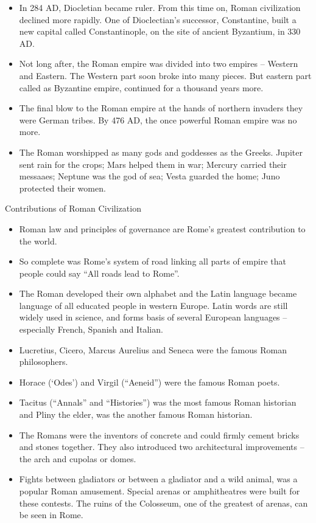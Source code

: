 \documentclass[
  openany]{book}
\providecommand{\tightlist}{%
  \setlength{\itemsep}{0pt}\setlength{\parskip}{0pt}}
\begin{document}
\begin{itemize}
\item
  In 284 AD, Diocletian became ruler. From this time on, Roman civilization declined more rapidly. One of Dioclectian's successor, Constantine, built a new capital called Constantinople, on the site of ancient Byzantium, in 330 AD.
\item
  Not long after, the Roman empire was divided into two empires -- Western and Eastern. The Western part soon broke into many pieces. But eastern part called as Byzantine empire, continued for a thousand years more.
\item
  The final blow to the Roman empire at the hands of northern invaders they were German tribes. By 476 AD, the once powerful Roman empire was no more.
\item
  The Roman worshipped as many gods and goddesses as the Greeks. Jupiter sent rain for the crops; Mars helped them in war; Mercury carried their messaaes; Neptune was the god of sea; Vesta guarded the home; Juno protected their women.
\end{itemize}

Contributions of Roman Civilization

\begin{itemize}
\tightlist
\item
  Roman law and principles of governance are Rome's greatest contribution to the world.
\item
  So complete was Rome's system of road linking all parts of empire that people could say ``All roads lead to Rome''.
\item
  The Roman developed their own alphabet and the Latin language became language of all educated people in western Europe. Latin words are still widely used in science, and forms basis of several European languages -- especially French, Spanish and Italian.
\item
  Lucretius, Cicero, Marcus Aurelius and Seneca were the famous Roman philosophers.
\item
  Horace (`Odes') and Virgil (``Aeneid'') were the famous Roman poets.
\item
  Tacitus (``Annals'' and ``Histories'') was the most famous Roman historian and Pliny the elder, was the another famous Roman historian.
\item
  The Romans were the inventors of concrete and could firmly cement bricks and stones together. They also introduced two architectural improvements -- the arch and cupolas or domes.
\item
  Fights between gladiators or between a gladiator and a wild animal, was a popular Roman amusement. Special arenas or amphitheatres were built for these contests. The ruins of the Colosseum, one of the greatest of arenas, can be seen in Rome.
\end{itemize}
\end{document}
